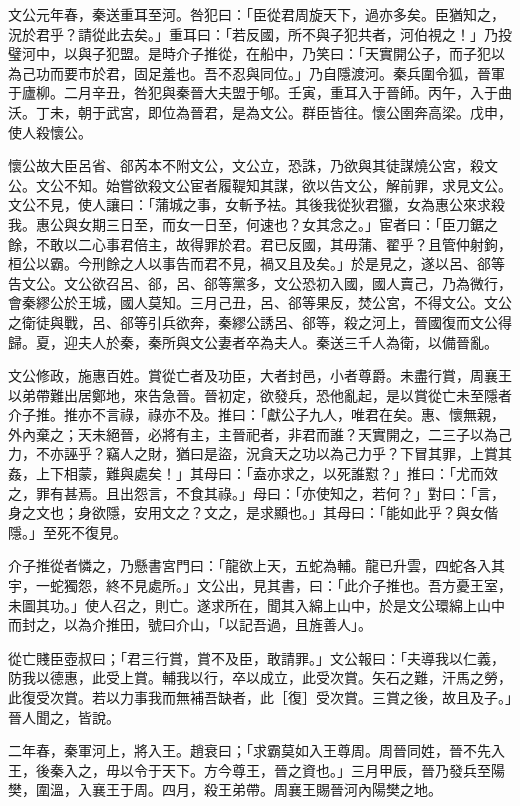 \begin{pinyinscope}
文公元年春，秦送重耳至河。咎犯曰：「臣從君周旋天下，過亦多矣。臣猶知之，況於君乎？請從此去矣。」重耳曰：「若反國，所不與子犯共者，河伯視之！」乃投璧河中，以與子犯盟。是時介子推從，在船中，乃笑曰：「天實開公子，而子犯以為己功而要市於君，固足羞也。吾不忍與同位。」乃自隱渡河。秦兵圍令狐，晉軍于廬柳。二月辛丑，咎犯與秦晉大夫盟于郇。壬寅，重耳入于晉師。丙午，入于曲沃。丁未，朝于武宮，即位為晉君，是為文公。群臣皆往。懷公圉奔高梁。戊申，使人殺懷公。

懷公故大臣呂省、郤芮本不附文公，文公立，恐誅，乃欲與其徒謀燒公宮，殺文公。文公不知。始嘗欲殺文公宦者履鞮知其謀，欲以告文公，解前罪，求見文公。文公不見，使人讓曰：「蒲城之事，女斬予袪。其後我從狄君獵，女為惠公來求殺我。惠公與女期三日至，而女一日至，何速也？女其念之。」宦者曰：「臣刀鋸之餘，不敢以二心事君倍主，故得罪於君。君已反國，其毋蒲、翟乎？且管仲射鉤，桓公以霸。今刑餘之人以事告而君不見，禍又且及矣。」於是見之，遂以呂、郤等告文公。文公欲召呂、郤，呂、郤等黨多，文公恐初入國，國人賣己，乃為微行，會秦繆公於王城，國人莫知。三月己丑，呂、郤等果反，焚公宮，不得文公。文公之衛徒與戰，呂、郤等引兵欲奔，秦繆公誘呂、郤等，殺之河上，晉國復而文公得歸。夏，迎夫人於秦，秦所與文公妻者卒為夫人。秦送三千人為衛，以備晉亂。

文公修政，施惠百姓。賞從亡者及功臣，大者封邑，小者尊爵。未盡行賞，周襄王以弟帶難出居鄭地，來告急晉。晉初定，欲發兵，恐他亂起，是以賞從亡未至隱者介子推。推亦不言祿，祿亦不及。推曰：「獻公子九人，唯君在矣。惠、懷無親，外內棄之；天未絕晉，必將有主，主晉祀者，非君而誰？天實開之，二三子以為己力，不亦誣乎？竊人之財，猶曰是盜，況貪天之功以為己力乎？下冒其罪，上賞其姦，上下相蒙，難與處矣！」其母曰：「盍亦求之，以死誰懟？」推曰：「尤而效之，罪有甚焉。且出怨言，不食其祿。」母曰：「亦使知之，若何？」對曰：「言，身之文也；身欲隱，安用文之？文之，是求顯也。」其母曰：「能如此乎？與女偕隱。」至死不復見。

介子推從者憐之，乃懸書宮門曰：「龍欲上天，五蛇為輔。龍已升雲，四蛇各入其宇，一蛇獨怨，終不見處所。」文公出，見其書，曰：「此介子推也。吾方憂王室，未圖其功。」使人召之，則亡。遂求所在，聞其入綿上山中，於是文公環綿上山中而封之，以為介推田，號曰介山，「以記吾過，且旌善人」。

從亡賤臣壺叔曰；「君三行賞，賞不及臣，敢請罪。」文公報曰：「夫導我以仁義，防我以德惠，此受上賞。輔我以行，卒以成立，此受次賞。矢石之難，汗馬之勞，此復受次賞。若以力事我而無補吾缺者，此［復］受次賞。三賞之後，故且及子。」晉人聞之，皆說。

二年春，秦軍河上，將入王。趙衰曰；「求霸莫如入王尊周。周晉同姓，晉不先入王，後秦入之，毋以令于天下。方今尊王，晉之資也。」三月甲辰，晉乃發兵至陽樊，圍溫，入襄王于周。四月，殺王弟帶。周襄王賜晉河內陽樊之地。


\end{pinyinscope}
